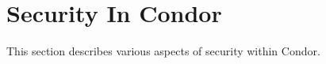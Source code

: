 \section{\label{sec:Security}Security In Condor}

This section describes various aspects of security within Condor.





